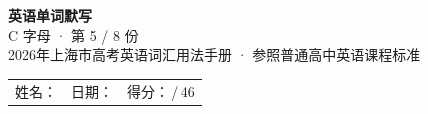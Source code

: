 \documentclass[10pt,a4paper]{article}
\begin{document}
\pagestyle{plain}

\begin{center}
{\LARGE\bfseries 英语单词默写}\\[0.22em]
{\large C 字母 · 第 5 / 8 份}\\[0.18em]
{\small 2026年上海市高考英语词汇用法手册 · 参照普通高中英语课程标准}
\end{center}

\vspace{0.25em}
\noindent\begin{tabular}{@{}p{}@{}p{}@{}p{}@{}}
姓名：\underline{\hspace{2.0cm}} & 日期：\underline{\hspace{2.0cm}} & 得分：\underline{\hspace{1.3cm}}\,/\,46 \\
\end{tabular}

\vspace{0.3em}

\vspace{0.08em}
\end{document}
